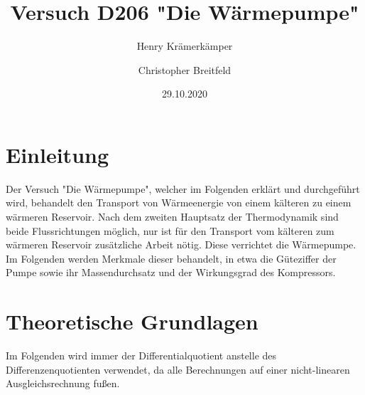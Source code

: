 \documentclass{scrartcl} %
\begin{document}
\title{Versuch D206 "Die Wärmepumpe"}
\author{Henry Krämerkämper \and Christopher Breitfeld}
\date{29.10.2020}
\maketitle
\newpage
\tableofcontents
\newpage
\section{Einleitung}
Der Versuch "Die Wärmepumpe", welcher im Folgenden erklärt und durchgeführt wird, behandelt den Transport von
Wärmeenergie von einem kälteren zu einem wärmeren Reservoir. Nach dem zweiten Hauptsatz der Thermodynamik sind beide
Flussrichtungen möglich, nur ist für den Transport vom kälteren zum wärmeren Reservoir zusätzliche Arbeit nötig. Diese verrichtet die Wärmepumpe.
Im Folgenden werden Merkmale dieser behandelt, in etwa die Güteziffer der Pumpe sowie ihr Massendurchsatz und der Wirkungsgrad des Kompressors.
\section{Theoretische Grundlagen}
Im Folgenden wird immer der Differentialquotient anstelle des Differenzenquotienten verwendet, da alle Berechnungen auf einer nicht-linearen Ausgleichsrechnung fußen.
\end{document}

